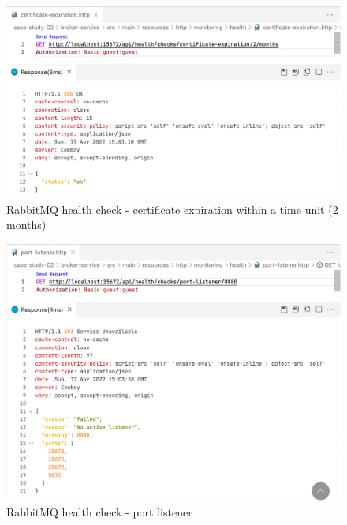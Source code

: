 \begin{figure}[H]
	\centering
	\includegraphics[width=1.0\linewidth]{./assets/images/case-studies/cs02-hc3.png}
	\caption{RabbitMQ health check - certificate expiration within a time unit (2 months)}
	\label{fig:cs02-hc3}
\end{figure}


\begin{figure}[H]
	\centering
	\includegraphics[width=1.0\linewidth]{./assets/images/case-studies/cs02-hc4.png}
	\caption{RabbitMQ health check - port listener}
	\label{fig:cs02-hc4}
\end{figure}



